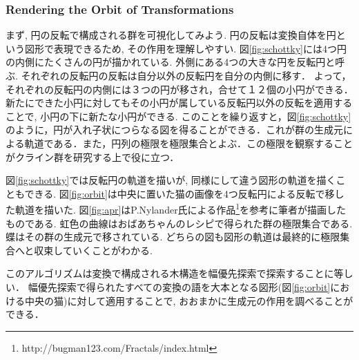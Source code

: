\subsubsection{Rendering the Orbit of Transformations}

まず, 円の反転で構成される群を可視化してみよう. 
円の反転は変換自体を円という図形で表現できるため, その作用を理解しやすい. 
図\ref{fig:schottky}には4つ円の内側にたくさんの円が描かれている. 
外側にある4つの大きな円を反転円と呼ぶ. 
それぞれの反転円の反転は自分以外の反転円を自分の内側に移す．
よって，それぞれの反転円の内側には３つの円が移され，合せて１２個の小円ができる．
新たにできた小円に対してもその小円が属している反転円以外の反転を適用することで, 小円の下に新たな小円ができる. 
このことを繰り返すと，図\ref{fig:schottky}のように，円が入れ子状につらなる図を得ることができる．これが群の生成元による軌道である．また，円列の極限を極限集合とよぶ．この極限を観察することがクライン群を研究する上で役に立つ．

図\ref{fig:schottky}では反転円の軌道を描いが, 同様にして違う図形の軌道を描くこともできる.
図\ref{fig:orbit}は中央に置いた猫の画像を4つ反転円による反転で移した軌道を描いた. 
図\ref{fig:apr}はP.Nylander氏による作品\footnote{http://bugman123.com/Fractals/index.html}を参考に筆者が描画したものである. 
虹色の曲線はおばあちゃんのレシピで得られた群の極限集合である. 
蝶はその群の生成元で移されている. 
どちらの図も図形の軌道は最終的に極限集合へと収束していくことがわかる. 

このアルゴリズムは変換で構成される木構造を幅優先探索で探索することに等しい．
幅優先探索で得られたすべての変換の語を大本となる図形(図\ref{fig:orbit}における中央の猫)に対して適用することで, おおまかに生成元の作用を調べることができる．

